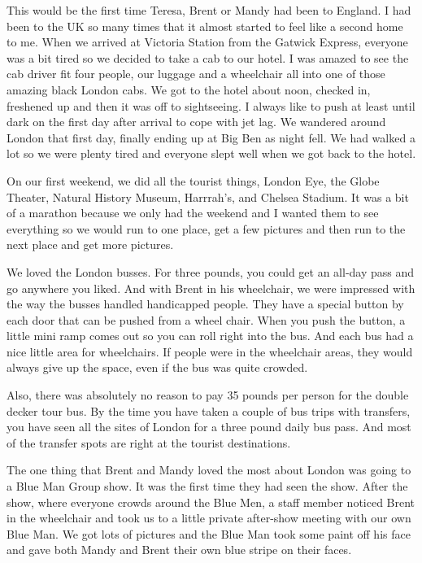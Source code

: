 \documentclass[12pt]{book}
\begin{document}
This would be the first time Teresa, Brent or Mandy had been to England.  I
had been to the UK so many times that it almost started to feel like a
second home to me.  When we arrived at Victoria Station from the Gatwick
Express, everyone was a bit tired so we decided to take a cab to our hotel.
I was amazed to see the cab driver fit four people, our luggage and a
wheelchair all into one of those amazing black London cabs.  We got to the
hotel about noon, checked in, freshened up and then it was off to
sightseeing.  I always like to push at least until dark on the first day after
arrival to cope with jet lag.  We wandered around London that first
day, finally ending up at Big Ben as night fell.   We had walked a lot so
we were plenty tired and everyone slept well when we got back to the hotel.

On our first weekend, we did all the tourist things,
London Eye, the Globe Theater, Natural History Museum, Harrrah's,
and Chelsea Stadium.  It was a bit of a marathon because we only had the
weekend and I wanted them to see everything so we would run to one place,
get a few pictures and then run to the next place and get more pictures.

We loved the London busses.   For three pounds, you could get an all-day
pass and go anywhere you liked.  And with Brent in his wheelchair, we
were impressed with the way the busses handled handicapped people.
They have a special button by each door that can be pushed from a wheel chair.
When you push the button, a little mini ramp comes out so you can roll
right into the bus.  And each bus had a nice little area for wheelchairs.
If people were in the wheelchair areas, they would always give up the space,
even if the bus was quite crowded.

Also, there was absolutely no reason to pay 35 pounds per person
for the double decker tour bus.  By the
time you have taken a couple of bus trips with transfers, you have seen
all the sites of London for a three pound daily bus pass.   And most of the
transfer spots are right at the tourist destinations.

The one thing that Brent and Mandy
loved the most about London was going to a Blue Man Group show.  It was the
first time they had seen the show.  After the show, where everyone crowds around
the Blue Men, a staff member noticed Brent in the wheelchair and
took us to a little private after-show meeting with our own Blue Man.  We
got lots of pictures and the Blue Man took some paint off his face and
gave both Mandy and Brent their own blue stripe on their faces.
\end{document}
